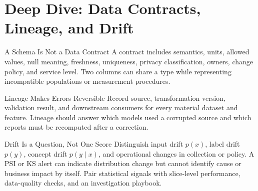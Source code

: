 %
\section{Deep Dive: Data Contracts, Lineage, and Drift}
\begin{v3topic}{A Schema Is Not a Data Contract}
A contract includes semantics, units, allowed values, null meaning, freshness,
uniqueness, privacy classification, owners, change policy, and service level.
Two columns can share a type while representing incompatible populations or
measurement procedures.

\end{v3topic}
\begin{v3topic}{Lineage Makes Errors Reversible}
Record source, transformation version, validation result, and downstream
consumers for every material dataset and feature.
Lineage should answer which models used a corrupted source and which reports
must be recomputed after a correction.

\end{v3topic}
\begin{v3topic}{Drift Is a Question, Not One Score}
Distinguish input drift $p(x)$, label drift $p(y)$, concept drift $p(y\mid x)$,
and operational changes in collection or policy.
A PSI or KS alert can indicate distribution change but cannot identify cause or
business impact by itself.
Pair statistical signals with slice-level performance, data-quality checks,
and an investigation playbook.
\end{v3topic}


